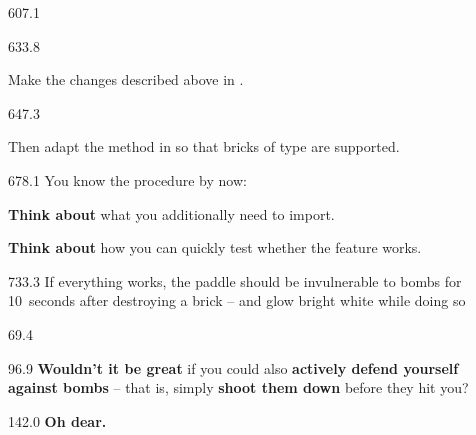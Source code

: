 \documentclass{aslab}
\newcommand*\emo[1]{\makebox[18bp][l]{\emoji{#1}}}
\begin{document}
\begin{region}{607.1}
\end{region}

\begin{region}{633.8}
\begin{tasks}
\item Make the changes described above in .
\end{tasks}
\end{region}

\begin{region}[pitch=13.3]{647.3}
\begin{tasks}[start=2]
\item Then adapt the method  in  so that
  bricks of type  are supported.
\end{tasks}
\end{region}

\begin{region}[x=74.7,right=0,pitch=14.2]{678.1}
You know the procedure by now:
\begin{bullets}
\item \textbf{Think about} what you additionally need to import.
\item \textbf{Think about} how you can quickly test whether the feature
  works.
\end{bullets}
\end{region}

\begin{region}[pitch=17.6]{733.3}
If everything works, the paddle should be invulnerable to bombs for
10~seconds after destroying a  brick -- and glow bright white
while doing so 
\end{region}

\nextpage
\begin{region}{69.4}
\end{region}

\begin{region}[pitch=14.3]{96.9}
\textbf{Wouldn't it be great} if you could also \textbf{actively defend
yourself against bombs} -- that is, simply \textbf{shoot them down} before
they hit you?
\end{region}

\begin{region}{142.0}
\emo{1F9E0}\textbf{Oh dear.}
\end{region}
\end{document}
